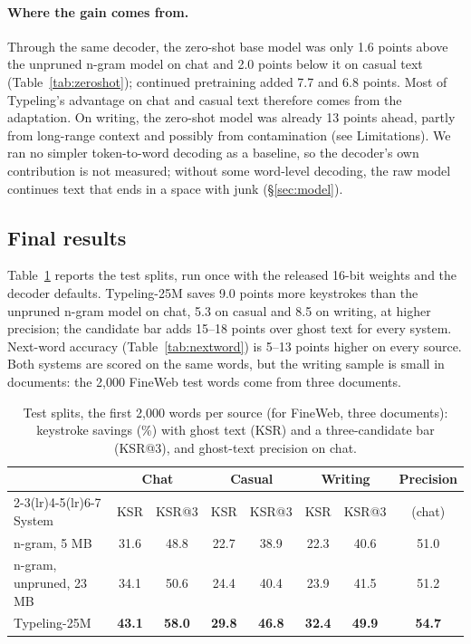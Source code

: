 \documentclass[11pt]{article}
\begin{document}
\paragraph{Where the gain comes from.} Through the same decoder, the zero-shot base model was only 1.6 points above
the unpruned n-gram model on chat and 2.0 points below it on casual text (Table~\ref{tab:zeroshot}); continued
pretraining added 7.7 and 6.8 points. Most of Typeling's advantage on chat and casual text therefore comes from the
adaptation. On writing, the zero-shot model was already 13 points ahead, partly from long-range context and possibly
from contamination (see Limitations). We ran no simpler token-to-word decoding as a baseline, so the decoder's own
contribution is not measured; without some word-level decoding, the raw model continues text that ends in a space
with junk (\S\ref{sec:model}).

\subsection{Final results}
\label{sec:final}

Table~\ref{tab:final} reports the test splits, run once with the released 16-bit weights and the decoder defaults.
Typeling-25M saves 9.0 points more keystrokes than the unpruned n-gram model on chat, 5.3 on casual and 8.5 on
writing, at higher precision; the candidate bar adds 15--18 points over ghost text for every system. Next-word
accuracy (Table~\ref{tab:nextword}) is 5--13 points higher on every source. Both systems are scored on the same
words, but the writing sample is small in documents: the 2,000 FineWeb test words come from three documents.

\begin{table}[t]
\centering
\small
\begin{tabular}{@{}lccccccc@{}}
\toprule
& \multicolumn{2}{c}{Chat} & \multicolumn{2}{c}{Casual} & \multicolumn{2}{c}{Writing} & Precision \\
\cmidrule(lr){2-3}\cmidrule(lr){4-5}\cmidrule(lr){6-7}
System & KSR & KSR@3 & KSR & KSR@3 & KSR & KSR@3 & (chat) \\
\midrule
n-gram, 5 MB & 31.6 & 48.8 & 22.7 & 38.9 & 22.3 & 40.6 & 51.0 \\
n-gram, unpruned, 23 MB & 34.1 & 50.6 & 24.4 & 40.4 & 23.9 & 41.5 & 51.2 \\
Typeling-25M & \textbf{43.1} & \textbf{58.0} & \textbf{29.8} & \textbf{46.8} & \textbf{32.4} & \textbf{49.9} &
\textbf{54.7} \\
\bottomrule
\end{tabular}
\caption{Test splits, the first 2,000 words per source (for FineWeb, three documents): keystroke savings (\%) with
ghost text (KSR) and a three-candidate bar (KSR@3), and ghost-text precision on chat.}
\label{tab:final}
\end{table}
\end{document}
